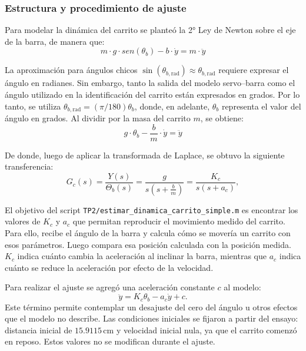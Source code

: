 \documentclass[a4paper, twoside, 10pt, spanish]{article}
\numberwithin{table}{section}
\begin{document}
    \subsubsection{Estructura y procedimiento de ajuste}


    Para modelar la dinámica del carrito se planteó la 2° Ley de Newton sobre el eje de la barra, de manera que:
    \begin{equation}
        m \cdot g \cdot sen(\theta_b) - b \cdot \dot y = m \cdot \ddot{y}
    \end{equation}

    La aproximación para ángulos chicos $\sin(\theta_{b,\mathrm{rad}})\approx\theta_{b,\mathrm{rad}}$ requiere expresar el ángulo en radianes. Sin embargo, tanto la salida del modelo servo--barra como el ángulo utilizado en la identificación del carrito están expresados en grados. Por lo tanto, se utiliza $\theta_{b,\mathrm{rad}}=(\pi/180)\theta_b$, donde, en adelante, $\theta_b$ representa el valor del ángulo en grados. Al dividir por la masa del carrito $m$, se obtiene:
    \begin{equation}
        g \cdot \theta_b - \frac{b}{m} \cdot \dot y = \ddot{y}
    \end{equation}

    De donde, luego de aplicar la transformada de Laplace, se obtuvo la siguiente transferencia:
    \begin{equation}
        G_c(s) = \frac{Y(s)}{\Theta_b(s)} = \frac{g}{s(s+\frac{b}{m})} = \frac{K_c}{s(s+a_c)},
    \end{equation}

    El objetivo del script \texttt{TP2/estimar\_dinamica\_carrito\_simple.m} es encontrar los valores de $K_c$ y $a_c$ que permitan reproducir el movimiento medido del carrito. Para ello, recibe el ángulo de la barra y calcula cómo se movería un carrito con esos parámetros. Luego compara esa posición calculada con la posición medida. $K_c$ indica cuánto cambia la aceleración al inclinar la barra, mientras que $a_c$ indica cuánto se reduce la aceleración por efecto de la velocidad.

    Para realizar el ajuste se agregó una aceleración constante $c$ al modelo:
    \begin{equation}
        \ddot y=K_c\theta_b-a_c\dot y+c.
    \end{equation}
    Este término permite contemplar un desajuste del cero del ángulo u otros efectos que el modelo no describe. Las condiciones iniciales se fijaron a partir del ensayo: distancia inicial de $15.9115\,\text{cm}$ y velocidad inicial nula, ya que el carrito comenzó en reposo. Estos valores no se modifican durante el ajuste.
\end{document}
